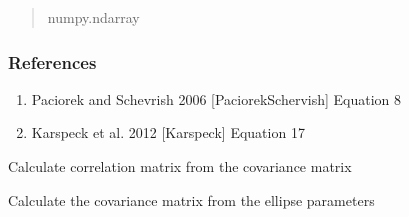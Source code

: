 \documentclass[letterpaper,10pt,english]{sphinxmanual}
\begin{document}
\begin{fulllineitems}
\begin{fulllineitems}
\begin{quote}
\begin{description}
\sphinxAtStartPar
numpy.ndarray

\end{description}\end{quote}
\subsubsection*{References}
\begin{enumerate}
%
\item {}
\sphinxAtStartPar
Paciorek and Schevrish 2006 {[}PaciorekSchervish{]} Equation 8

\item {}
\sphinxAtStartPar
Karspeck et al. 2012 {[}Karspeck{]} Equation 17

\end{enumerate}

\end{fulllineitems}


\begin{fulllineitems}
\label{\detokenize{ellipse:glomar_gridding.ellipse.EllipseCovarianceBuilder.calculate_cor}}
\pysigstartsignatures
\pysiglinewithargsret
{}
{}
{}
\pysigstopsignatures
\sphinxAtStartPar
Calculate correlation matrix from the covariance matrix
\begin{quote}\begin{description}
\sphinxAtStartPar
{}

\end{description}\end{quote}

\end{fulllineitems}


\begin{fulllineitems}
\label{\detokenize{ellipse:glomar_gridding.ellipse.EllipseCovarianceBuilder.calculate_covariance_array}}
\pysigstartsignatures
\pysiglinewithargsret
{}
{}
{}
\pysigstopsignatures
\sphinxAtStartPar
Calculate the covariance matrix from the ellipse parameters
\begin{quote}\begin{description}
\sphinxAtStartPar
{}


\end{description}
\end{quote}
\end{fulllineitems}
\end{fulllineitems}
\end{document}
